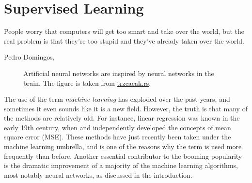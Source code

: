 \chapter{Supervised Learning} \label{chp:machinelearning}
\epigraph{People worry that computers will get too smart and take over the world, but the real problem is that they're too stupid and they've already taken over the world.}{Pedro Domingos, \supercite{domingos_master_2015}}
\begin{figure}[H]
	\centering
	\caption{Artificial neural networks are inspired by neural networks in the brain. The figure is taken from  \href{http://www.trzcacak.rs}{trzcacak.rs}.}
\end{figure}

The use of the term \textit{machine learning} has exploded over the past years, and sometimes it even sounds like it is a new field. However, the truth is that many of the methods are relatively old. For instance, linear regression was known in the early 19th century, when \citet{legendre_nouvelles_1805} and \citet{gauss_theoria_1809} independently developed the concepts of mean square error (MSE). These methods have just recently been taken under the machine learning umbrella, and is one of the reasons why the term is used more frequently than before. Another essential contributor to the booming popularity is the dramatic improvement of a majority of the machine learning algorithms, most notably neural networks, as discussed in the introduction.

